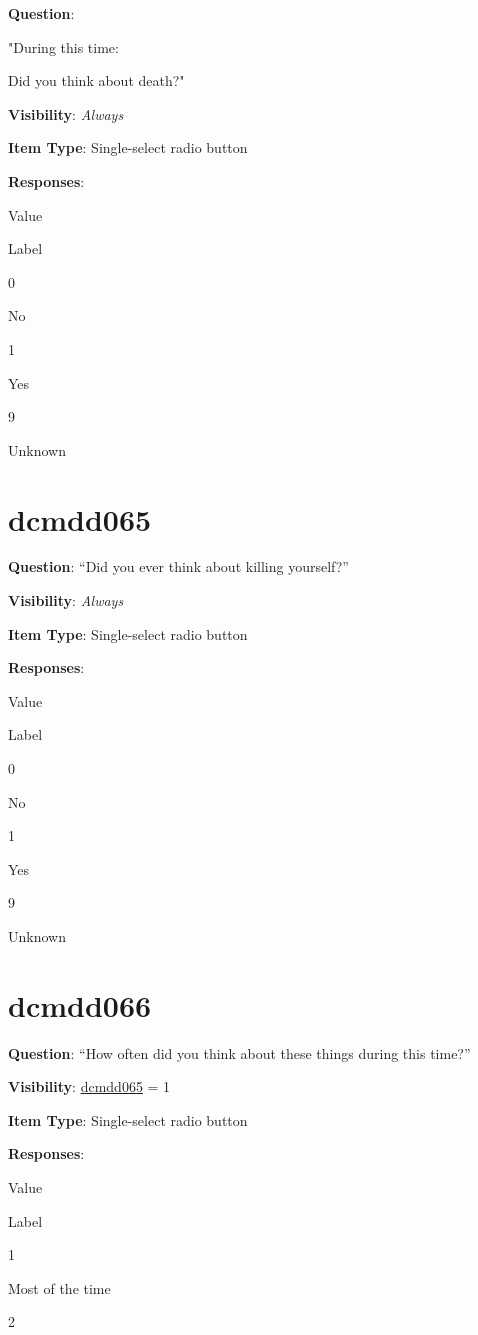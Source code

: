 \documentclass[
]{book}
\begin{document}
\textbf{Question}:

"During this time:

Did you think about death?"

\textbf{Visibility}: \emph{Always}

\textbf{Item Type}: Single-select radio button

\textbf{Responses}:

Value

Label

0

No

1

Yes

9

Unknown

\hypertarget{dcmdd065}{%
\section{dcmdd065}\label{dcmdd065}}

\textbf{Question}: ``Did you ever think about killing yourself?''

\textbf{Visibility}: \emph{Always}

\textbf{Item Type}: Single-select radio button

\textbf{Responses}:

Value

Label

0

No

1

Yes

9

Unknown

\hypertarget{dcmdd066}{%
\section{dcmdd066}\label{dcmdd066}}

\textbf{Question}: ``How often did you think about these things during this time?''

\textbf{Visibility}: \protect\hyperlink{dcmdd065}{dcmdd065} = 1

\textbf{Item Type}: Single-select radio button

\textbf{Responses}:

Value

Label

1

Most of the time

2
\end{document}
